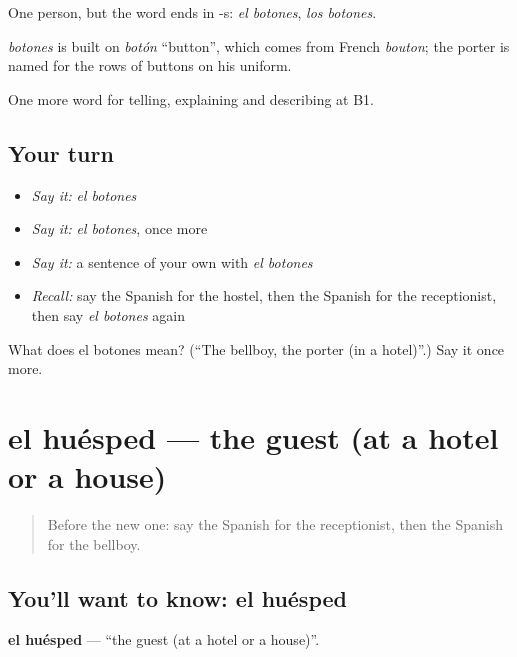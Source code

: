 One person, but the word ends in -s: \emph{el botones}, \emph{los botones}.

\begin{cousinweb}
\emph{botones} is built on \emph{botón} \textquotedblleft{}button\textquotedblright{}, which comes from French \emph{bouton}; the porter is named for the rows of buttons on his uniform.
\end{cousinweb}

\begin{grammarlens}[title={What you've built}]
One more word for telling, explaining and describing at B1.
\end{grammarlens}

\subsection*{Your turn}
\begin{itemize}
\raggedright
  \item \emph{Say it:} \emph{el botones}
  \item \emph{Say it:} \emph{el botones}, once more
  \item \emph{Say it:} a sentence of your own with \emph{el botones}
  \item \emph{Recall:} say the Spanish for the hostel, then the Spanish for the receptionist, then say \emph{el botones} again
\end{itemize}

\begin{tcolorbox}[breakable,colback=teal!4,colframe=teal!35!black,title={Before you move on}]
What does el botones mean? (\textquotedblleft{}The bellboy, the porter (in a hotel)\textquotedblright{}.) Say it once more.
\end{tcolorbox}
\section[el huésped]{el huésped — the guest (at a hotel or a house)}

\label{lesson:ES-C661-huesped}



\begin{quote}
Before the new one: say the Spanish for the receptionist, then the Spanish for the bellboy.
\end{quote}

\subsection*{You'll want to know: el huésped}
\textbf{el huésped} — \textquotedblleft{}the guest (at a hotel or a house)\textquotedblright{}.

